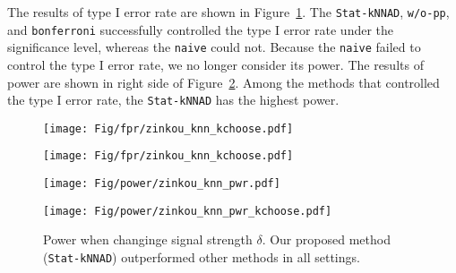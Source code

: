 %
The results of type I error rate are shown in Figure~\ref{fig:synthetic_fpr}.
%
The \texttt{Stat-kNNAD}, \texttt{w/o-pp}, and \texttt{bonferroni} successfully controlled the type I error rate under the significance level, whereas the \texttt{naive} could not.
%
Because the \texttt{naive} failed to control the type I error rate, we no longer consider its power.
%
The results of power are shown in right side of Figure~\ref{fig:synthetic_power}.
%
Among the methods that controlled the type I error rate, the \texttt{Stat-kNNAD} has the highest power.
%
\begin{figure}[H]
  \centering
  \begin{minipage}[b]{0.48\linewidth}
      \centering
      \texttt{[image: Fig/fpr/zinkou\_knn\_kchoose.pdf]}
  \end{minipage}
  \begin{minipage}[b]{0.48\linewidth}
      \centering
      \texttt{[image: Fig/fpr/zinkou\_knn\_kchoose.pdf]}
  \end{minipage}
  \caption{
  }
  \label{fig:synthetic_fpr}
\end{figure}
%
\begin{figure}[H]
  \centering
  \begin{minipage}[b]{0.48\linewidth}
      \centering
      \texttt{[image: Fig/power/zinkou\_knn\_pwr.pdf]}
  \end{minipage}
  \begin{minipage}[b]{0.48\linewidth}
      \centering
      \texttt{[image: Fig/power/zinkou\_knn\_pwr\_kchoose.pdf]}
  \end{minipage}
  \caption{
      Power when changinge signal strength $\delta$.
      Our proposed method (\texttt{Stat-kNNAD}) outperformed other methods in all settings.
  }
  \label{fig:synthetic_power}
\end{figure}


